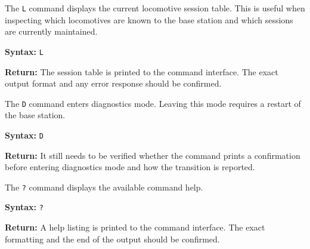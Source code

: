 
The \texttt{L} command displays the current locomotive session table. This
is useful when inspecting which locomotives are known to the base station
and which sessions are currently maintained.

\textbf{Syntax:} \texttt{L}

\textbf{Return:} The session table is printed to the command interface.
The exact output format and any error response should be confirmed.


The \texttt{D} command enters diagnostics mode. Leaving this mode requires
a restart of the base station.

\textbf{Syntax:} \texttt{D}

\textbf{Return:} It still needs to be verified whether the command prints
a confirmation before entering diagnostics mode and how the transition
is reported.


The \texttt{?} command displays the available command help.

\textbf{Syntax:} \texttt{?}

\textbf{Return:} A help listing is printed to the command interface. The
exact formatting and the end of the output should be confirmed.






